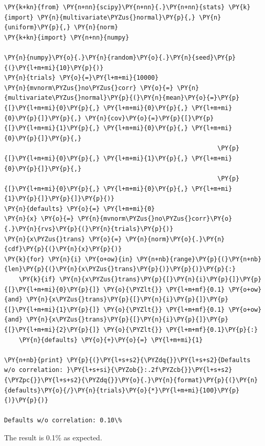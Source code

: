 \begin{tcolorbox}[breakable, size=fbox, boxrule=1pt, pad at break*=1mm,colback=cellbackground, colframe=cellborder]
\begin{Verbatim}[commandchars=\\\{\}]
\PY{k+kn}{from} \PY{n+nn}{scipy}\PY{n+nn}{.}\PY{n+nn}{stats} \PY{k}{import} \PY{n}{multivariate\PYZus{}normal}\PY{p}{,} \PY{n}{uniform}\PY{p}{,} \PY{n}{norm}
\PY{k+kn}{import} \PY{n+nn}{numpy}
	
\PY{n}{numpy}\PY{o}{.}\PY{n}{random}\PY{o}{.}\PY{n}{seed}\PY{p}{(}\PY{l+m+mi}{10}\PY{p}{)}
\PY{n}{trials} \PY{o}{=}\PY{l+m+mi}{10000}
\PY{n}{mvnorm\PYZus{}no\PYZus{}corr} \PY{o}{=} \PY{n}{multivariate\PYZus{}normal}\PY{p}{(}\PY{n}{mean}\PY{o}{=}\PY{p}{[}\PY{l+m+mi}{0}\PY{p}{,} \PY{l+m+mi}{0}\PY{p}{,} \PY{l+m+mi}{0}\PY{p}{]}\PY{p}{,} \PY{n}{cov}\PY{o}{=}\PY{p}{[}\PY{p}{[}\PY{l+m+mi}{1}\PY{p}{,} \PY{l+m+mi}{0}\PY{p}{,} \PY{l+m+mi}{0}\PY{p}{]}\PY{p}{,}
                                                          \PY{p}{[}\PY{l+m+mi}{0}\PY{p}{,} \PY{l+m+mi}{1}\PY{p}{,} \PY{l+m+mi}{0}\PY{p}{]}\PY{p}{,}
                                                          \PY{p}{[}\PY{l+m+mi}{0}\PY{p}{,} \PY{l+m+mi}{0}\PY{p}{,} \PY{l+m+mi}{1}\PY{p}{]}\PY{p}{]}\PY{p}{)}
\PY{n}{defaults} \PY{o}{=} \PY{l+m+mi}{0}
\PY{n}{x} \PY{o}{=} \PY{n}{mvnorm\PYZus{}no\PYZus{}corr}\PY{o}{.}\PY{n}{rvs}\PY{p}{(}\PY{n}{trials}\PY{p}{)}
\PY{n}{x\PYZus{}trans} \PY{o}{=} \PY{n}{norm}\PY{o}{.}\PY{n}{cdf}\PY{p}{(}\PY{n}{x}\PY{p}{)}
\PY{k}{for} \PY{n}{i} \PY{o+ow}{in} \PY{n+nb}{range}\PY{p}{(}\PY{n+nb}{len}\PY{p}{(}\PY{n}{x\PYZus{}trans}\PY{p}{)}\PY{p}{)}\PY{p}{:}
    \PY{k}{if} \PY{n}{x\PYZus{}trans}\PY{p}{[}\PY{n}{i}\PY{p}{]}\PY{p}{[}\PY{l+m+mi}{0}\PY{p}{]} \PY{o}{\PYZlt{}} \PY{l+m+mf}{0.1} \PY{o+ow}{and} \PY{n}{x\PYZus{}trans}\PY{p}{[}\PY{n}{i}\PY{p}{]}\PY{p}{[}\PY{l+m+mi}{1}\PY{p}{]} \PY{o}{\PYZlt{}} \PY{l+m+mf}{0.1} \PY{o+ow}{and} \PY{n}{x\PYZus{}trans}\PY{p}{[}\PY{n}{i}\PY{p}{]}\PY{p}{[}\PY{l+m+mi}{2}\PY{p}{]} \PY{o}{\PYZlt{}} \PY{l+m+mf}{0.1}\PY{p}{:}
	\PY{n}{defaults} \PY{o}{+}\PY{o}{=} \PY{l+m+mi}{1}
	
\PY{n+nb}{print} \PY{p}{(}\PY{l+s+s2}{\PYZdq{}}\PY{l+s+s2}{Defaults w/o correlation: }\PY{l+s+si}{\PYZob{}:.2f\PYZcb{}}\PY{l+s+s2}{\PYZpc{}}\PY{l+s+s2}{\PYZdq{}}\PY{o}{.}\PY{n}{format}\PY{p}{(}\PY{n}{defaults}\PY{o}{/}\PY{n}{trials}\PY{o}{*}\PY{l+m+mi}{100}\PY{p}{)}\PY{p}{)}

Defaults w/o correlation: 0.10\%
\end{Verbatim}
\end{tcolorbox}
The result is 0.1\% as expected.

